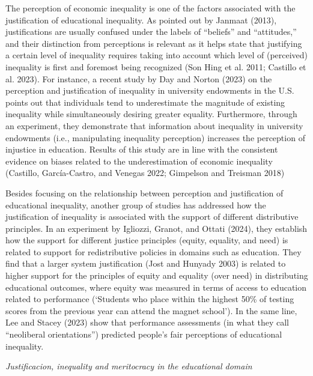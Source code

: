\documentclass[
]{article}
\begin{document}
The perception of economic inequality is one of the factors associated
with the justification of educational inequality. As pointed out by
Janmaat (2013), justifications are usually confused under the labels of
``beliefs'' and ``attitudes,'' and their distinction from perceptions is
relevant as it helps state that justifying a certain level of inequality
requires taking into account which level of (perceived) inequality is
first and foremost being recognized (Son Hing et al. 2011; Castillo et
al. 2023). For instance, a recent study by Day and Norton (2023) on the
perception and justification of inequality in university endowments in
the U.S. points out that individuals tend to underestimate the magnitude
of existing inequality while simultaneously desiring greater equality.
Furthermore, through an experiment, they demonstrate that information
about inequality in university endowments (i.e., manipulating inequality
perception) increases the perception of injustice in education. Results
of this study are in line with the consistent evidence on biases related
to the underestimation of economic inequality (Castillo, García-Castro,
and Venegas 2022; Gimpelson and Treisman 2018)

Besides focusing on the relationship between perception and
justification of educational inequality, another group of studies has
addressed how the justification of inequality is associated with the
support of different distributive principles. In an experiment by
Igliozzi, Granot, and Ottati (2024), they establish how the support for
different justice principles (equity, equality, and need) is related to
support for redistributive policies in domains such as education. They
find that a larger system justification (Jost and Hunyady 2003) is
related to higher support for the principles of equity and equality
(over need) in distributing educational outcomes, where equity was
measured in terms of access to education related to performance
(`Students who place within the highest 50\% of testing scores from the
previous year can attend the magnet school'). In the same line, Lee and
Stacey (2023) show that performance assessments (in what they call
``neoliberal orientations'') predicted people's fair perceptions of
educational inequality.

\emph{Justificacion, inequality and meritocracy in the educational
domain}
\end{document}
